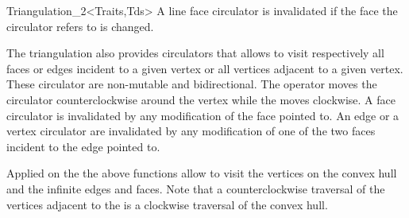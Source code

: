 \begin{ccClassTemplate}{Triangulation_2<Traits,Tds>}
A line face circulator is invalidated if the face the circulator refers
to is changed.

\ccThreeToTwo




The triangulation also provides circulators that allows to visit 
respectively all faces or edges incident to a given vertex
or all vertices adjacent to a given vertex.
These circulator are
non-mutable
and bidirectional.
 The operator  moves the circulator
counterclockwise around the vertex while
the  moves clockwise.
A face circulator is invalidated by any modification of the face pointed to.
An edge or a vertex circulator are invalidated by any modification
of one of the two faces incident to the edge pointed to.

\ccGlue
{}
\ccGlue
{}



Applied on the 
the above  functions  allow to visit the vertices on the convex hull and
the infinite edges and faces. Note that a counterclockwise
traversal of the vertices adjacent to the  is
a clockwise traversal of the convex hull.

\ccGlue
{}
\ccGlue
{} {}




\end{ccClassTemplate}
